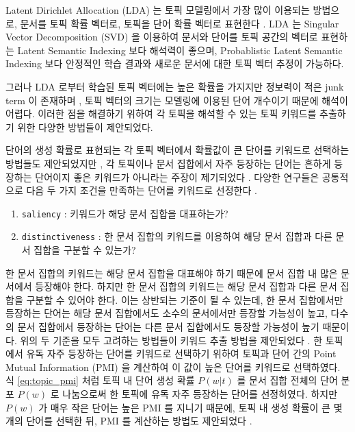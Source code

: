\documentclass[11pt]{article}
\begin{document}
Latent Dirichlet Allocation (LDA) 는 토픽 모델링에서 가장 많이 이용되는 방법으로, 문서를 토픽 확률 벡터로, 토픽을 단어 확률 벡터로 표현한다 \citep{blei2003latent}.
LDA 는 Singular Vector Decomposition (SVD) 을 이용하여 문서와 단어를 토픽 공간의 벡터로 표현하는 Latent Semantic Indexing \citep{landauer1998introduction} 보다 해석력이 좋으며, Probablistic Latent Semantic Indexing \citep{hofmann1999probabilistic} 보다 안정적인 학습 결과와 새로운 문서에 대한 토픽 벡터 추정이 가능하다.

그러나 LDA 로부터 학습된 토픽 벡터에는 높은 확률을 가지지만 정보력이 적은 junk term 이 존재하며 \citep{newman2010evaluating}, 토픽 벡터의 크기는 모델링에 이용된 단어 개수이기 때문에 해석이 어렵다.
이러한 점을 해결하기 위하여 각 토픽을 해석할 수 있는 토픽 키워드를 추출하기 위한 다양한 방법들이 제안되었다. 

단어의 생성 확률로 표현되는 각 토픽 벡터에서 확률값이 큰 단어를 키워드로 선택하는 방법들도 제안되었지만 \citep{snyder2013topic, chuang2013topic, wallach2009evaluation}, 각 토픽이나 문서 집합에서 자주 등장하는 단어는 흔하게 등장하는 단어이지 좋은 키워드가 아니라는 주장이 제기되었다 \citep{ramage09tmsocial, newman2010evaluating, chuang2012interpretation}.
다양한 연구들은 공통적으로 다음 두 가지 조건을 만족하는 단어를 키워드로 선정한다 \citep{chuang2012termite}.

\begin{enumerate}[noitemsep]
  \item \texttt{saliency} : 키워드가 해당 문서 집합을 대표하는가?
  \item \texttt{distinctiveness} : 한 문서 집합의 키워드를 이용하여 해당 문서 집합과 다른 문서 집합을 구분할 수 있는가?
\end{enumerate}

한 문서 집합의 키워드는 해당 문서 집합을 대표해야 하기 때문에 문서 집합 내 많은 문서에서 등장해야 한다.
하지만 한 문서 집합의 키워드는 해당 문서 집합과 다른 문서 집합을 구분할 수 있어야 한다.
이는 상반되는 기준이 될 수 있는데, 한 문서 집합에서만 등장하는 단어는 해당 문서 집합에서도 소수의 문서에서만 등장할 가능성이 높고, 다수의 문서 집합에서 등장하는 단어는 다른 문서 집합에서도 등장할 가능성이 높기 때문이다.
위의 두 기준을 모두 고려하는 방법들이 키워드 추출 방법을 제안되었다 \citep{bischof2012summarizing, newman2010evaluating, taddy2012estimation}.
한 토픽에서 유독 자주 등장하는 단어를 키워드로 선택하기 위하여 \citep{newman2010evaluating, taddy2012estimation, mimno2011optimizing} 토픽과 단어 간의 Point Mutual Information (PMI) 을 계산하여 이 값이 높은 단어를 키워드로 선택하였다.
식 \ref{eq:topic_pmi} 처럼 토픽 내 단어 생성 확률 $P(w \vert t)$ 를 문서 집합 전체의 단어 분포 $P(w)$ 로 나눔으로써 한 토픽에 유독 자주 등장하는 단어를 선정하였다.
하지만 $P(w)$ 가 매우 작은 단어는 높은 PMI 를 지니기 때문에, 토픽 내 생성 확률이 큰 몇 개의 단어를 선택한 뒤, PMI 를 계산하는 방법도 제안되었다 \citep{newman2010evaluating, alsumait2009topic}.
\end{document}
